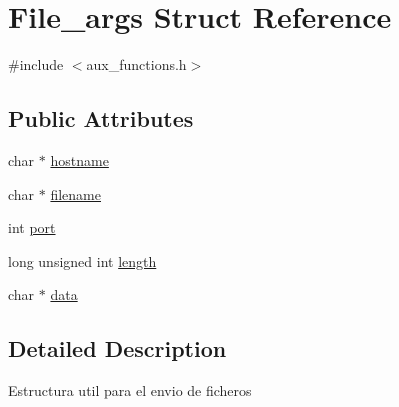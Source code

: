 \hypertarget{struct_file__args}{\section{File\-\_\-args Struct Reference}
\label{struct_file__args}
}


{\ttfamily \#include $<$aux\-\_\-functions.\-h$>$}

\subsection*{Public Attributes}
\begin{DoxyCompactItemize}
\item 
char $\ast$ \hyperlink{struct_file__args_a9aa177aea3a099397a09131a92f30115}{hostname}
\item 
char $\ast$ \hyperlink{struct_file__args_ad24dfcb255f29ee677793a0051c7336b}{filename}
\item 
int \hyperlink{struct_file__args_a83e78eb2ebacdc7e63eca61d1340fa61}{port}
\item 
long unsigned int \hyperlink{struct_file__args_a3168e8734e7ad263d88a6da49b4aff20}{length}
\item 
char $\ast$ \hyperlink{struct_file__args_a0fda96130bd2c0d56e9508b37fb822a2}{data}
\end{DoxyCompactItemize}


\subsection{Detailed Description}
Estructura util para el envio de ficheros 

